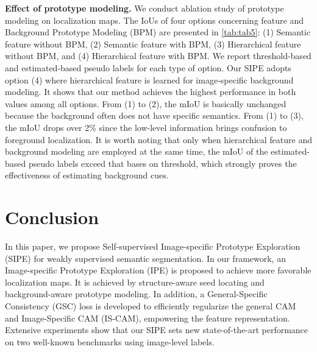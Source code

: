 \documentclass[10pt,twocolumn,letterpaper]{article}
\begin{document}
\textbf{Effect of prototype modeling.}
We conduct ablation study of prototype modeling on localization maps.
The IoUs of four options concerning feature and Background Prototype Modeling (BPM) are presented in \cref{tab:tab5}:
(1) Semantic feature without BPM,
(2) Semantic feature with BPM,
(3) Hierarchical feature without BPM,
and (4) Hierarchical feature with BPM.
We report threshold-based and estimated-based pseudo labels for each type of option.
Our SIPE adopts option (4) where hierarchical feature is learned for image-specific background modeling.
It shows that our method achieves the highest performance in both values among all options.
From (1) to (2), the mIoU is basically unchanged because the background often does not have specific semantics.
From (1) to (3), the mIoU drops over 2\% since the low-level information brings confusion to foreground localization.
It is worth noting that only when hierarchical feature and background modeling are employed at the same time, the mIoU of the estimated-based pseudo labels exceed that bases on threshold, which strongly proves the effectiveness of estimating background cues.


\section{Conclusion}
In this paper, we propose Self-supervised Image-specific Prototype Exploration (SIPE) for weakly supervised semantic segmentation.
In our framework, an Image-specific Prototype Exploration (IPE) is proposed to achieve more favorable localization maps.
It is achieved by structure-aware seed locating and background-aware prototype modeling.
In addition, a General-Specific Consistency (GSC) loss is developed to efficiently regularize the general CAM and Image-Specific CAM (IS-CAM), empowering the feature representation.
Extensive experiments show that our SIPE sets new state-of-the-art performance on two well-known benchmarks using image-level labels.
\end{document}

